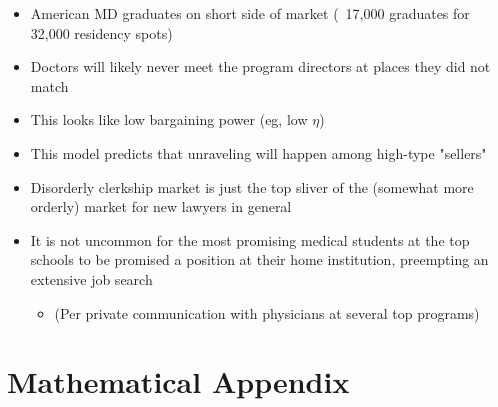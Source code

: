 \documentclass[WP]{AEA}
\begin{document}
\begin{itemize}
\item American MD graduates on short side of market (~17,000 graduates for 32,000 residency spots)
\item Doctors will likely never meet the program directors at places they did not match
\item This looks like low bargaining power (eg, low $\eta$)
\end{itemize}


\begin{itemize}
\item This model predicts that unraveling will happen among high-type "sellers"
\item Disorderly clerkship market is just the top sliver of the (somewhat more orderly) market for new lawyers in general
\item It is not  uncommon for the most promising medical students at the top schools to be promised a position at their home institution, preempting an extensive job search
\begin{itemize}
	\item (Per private communication with physicians at several top programs)
\end{itemize}
\end{itemize}




\appendix

\section{Mathematical Appendix}
\end{document}
